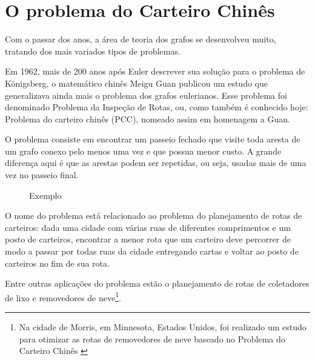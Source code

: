 \chapter{O problema do Carteiro Chinês}

Com o passar dos anos, a área de teoria dos grafos se desenvolveu muito, tratando dos mais variados tipos de problemas.

Em 1962, mais de 200 anos após Euler descrever sua solução para o problema de Königsberg, o matemático chinês Meigu Guan publicou um estudo \cite{guan} que generalizava ainda mais o problema dos grafos eulerianos. 
Esse problema foi denominado Problema da Inspeção de Rotas, ou, como também é conhecido hoje: Problema do carteiro chinês (PCC), nomeado assim em homenagem a Guan.

O problema consiste em encontrar um passeio fechado que visite toda aresta de um grafo conexo pelo menos uma vez e que possua menor custo. 
A grande diferença aqui é que as arestas podem ser repetidas, ou seja, usadas mais de uma vez no passeio final.

\begin{wrapfigure}{l}{0.3\textwidth} 
    \centering
	\caption{Exemplo}
	\label{graph}
\end{wrapfigure}

O nome do problema está relacionado ao problema do planejamento de rotas de carteiros: dada uma cidade com várias ruas de diferentes comprimentos e um posto de carteiros, encontrar a menor rota que um carteiro deve percorrer de modo a passar por todas ruas da cidade entregando cartas e voltar ao posto de carteiros no fim de sua rota.

Entre outras aplicações do problema estão o planejamento de rotas de coletadores de lixo e removedores de neve\footnote{Na cidade de Morris, em Minnesota, Estados Unidos, foi realizado um estudo para otimizar as rotas de removedores de neve baseado no Problema do Carteiro Chinês \cite{snow-removal}}.

